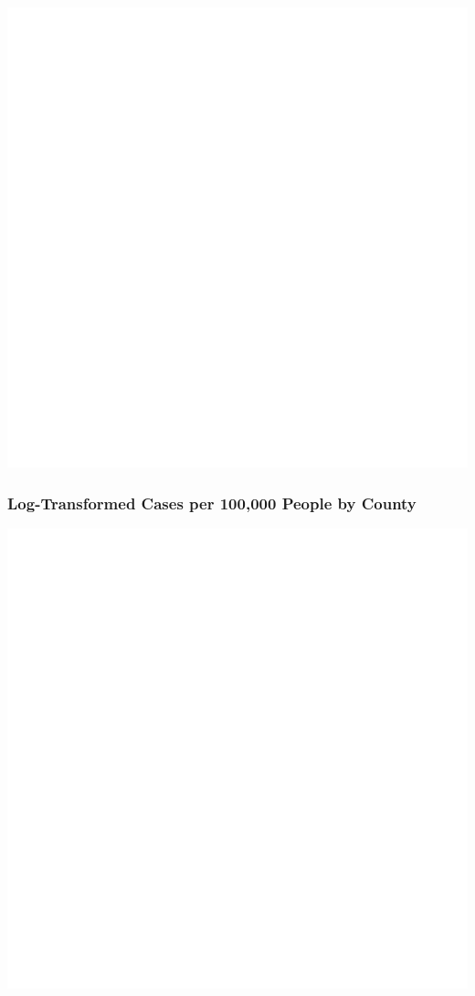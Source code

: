 \documentclass[]{article}
\begin{document}
\includegraphics{figs/daily-cases-100k-1}

\hypertarget{log-transformed-cases-per-100000-people-by-county}{%
\subsubsection{Log-Transformed Cases per 100,000 People by
County}\label{log-transformed-cases-per-100000-people-by-county}}

\includegraphics{figs/daily-cases-100k-log-1}
\end{document}
